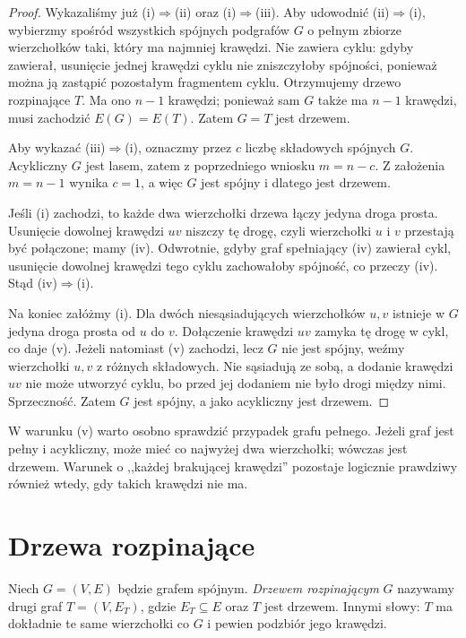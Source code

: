 \begin{proof}
Wykazaliśmy już (i)$\Rightarrow$(ii) oraz
(i)$\Rightarrow$(iii). Aby udowodnić
(ii)$\Rightarrow$(i), wybierzmy spośród wszystkich
spójnych podgrafów $G$ o pełnym zbiorze
wierzchołków taki, który ma najmniej krawędzi.
Nie zawiera cyklu: gdyby zawierał, usunięcie
jednej krawędzi cyklu nie zniszczyłoby spójności,
ponieważ można ją zastąpić pozostałym fragmentem
cyklu. Otrzymujemy drzewo rozpinające $T$.
Ma ono $n-1$ krawędzi; ponieważ sam $G$ także
ma $n-1$ krawędzi, musi zachodzić $E(G)=E(T)$.
Zatem $G=T$ jest drzewem.

Aby wykazać (iii)$\Rightarrow$(i), oznaczmy
przez $c$ liczbę składowych spójnych $G$.
Acykliczny $G$ jest lasem, zatem z poprzedniego
wniosku $m=n-c$. Z założenia $m=n-1$ wynika
$c=1$, a więc $G$ jest spójny i dlatego jest
drzewem.

Jeśli (i) zachodzi, to każde dwa wierzchołki
drzewa łączy jedyna droga prosta. Usunięcie
dowolnej krawędzi $uv$ niszczy tę drogę, czyli
wierzchołki $u$ i $v$ przestają być połączone;
mamy (iv). Odwrotnie, gdyby graf spełniający
(iv) zawierał cykl, usunięcie dowolnej krawędzi
tego cyklu zachowałoby spójność, co przeczy (iv).
Stąd (iv)$\Rightarrow$(i).

Na koniec załóżmy (i). Dla dwóch niesąsiadujących
wierzchołków $u,v$ istnieje w $G$ jedyna droga
prosta od $u$ do $v$. Dołączenie krawędzi $uv$
zamyka tę drogę w cykl, co daje (v).
Jeżeli natomiast (v) zachodzi, lecz $G$ nie
jest spójny, weźmy wierzchołki $u,v$ z różnych
składowych. Nie sąsiadują ze sobą, a dodanie
krawędzi $uv$ nie może utworzyć cyklu, bo
przed jej dodaniem nie było drogi między nimi.
Sprzeczność. Zatem $G$ jest spójny, a jako
acykliczny jest drzewem.
\end{proof}

\begin{uwaga}
W warunku (v) warto osobno sprawdzić przypadek grafu
pełnego. Jeżeli graf jest pełny i acykliczny,
może mieć co najwyżej dwa wierzchołki; wówczas
jest drzewem. Warunek o ,,każdej brakującej krawędzi''
pozostaje logicznie prawdziwy również wtedy, gdy
takich krawędzi nie ma.
\end{uwaga}

\section{Drzewa rozpinające}
\label{sec:tg-rozpinajace}

\begin{definicja}
Niech $G=(V,E)$ będzie grafem spójnym.
\emph{Drzewem rozpinającym} $G$ nazywamy
drugi graf $T=(V,E_T)$, gdzie $E_T\subseteq E$
oraz $T$ jest drzewem. Innymi słowy:
$T$ ma dokładnie te same wierzchołki co $G$
i pewien podzbiór jego krawędzi.
\end{definicja}

